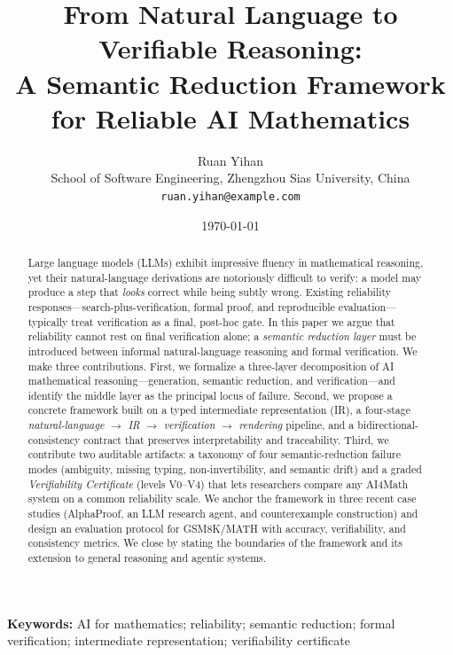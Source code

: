 \documentclass[11pt,a4paper]{article}
\title{\bfseries From Natural Language to Verifiable Reasoning:\\
A Semantic Reduction Framework for Reliable AI Mathematics}
\author{
  Ruan Yihan\\
  \small School of Software Engineering, Zhengzhou Sias University, China\\
  \small \texttt{ruan.yihan@example.com}
}
\date{\today}
\theoremstyle{definition}
\theoremstyle{plain}
\begin{document}
\maketitle

\begin{abstract}
\noindent
Large language models (LLMs) exhibit impressive fluency in mathematical reasoning, yet their
natural-language derivations are notoriously difficult to verify: a model may produce a step that
\emph{looks} correct while being subtly wrong. Existing reliability responses---search-plus-verification,
formal proof, and reproducible evaluation---typically treat verification as a final, post-hoc gate.
In this paper we argue that reliability cannot rest on final verification alone; a \emph{semantic
reduction layer} must be introduced between informal natural-language reasoning and formal verification.
We make three contributions. First, we formalize a three-layer decomposition of AI mathematical
reasoning---generation, semantic reduction, and verification---and identify the middle layer as the
principal locus of failure. Second, we propose a concrete framework built on a typed intermediate
representation (IR), a four-stage \emph{natural-language $\rightarrow$ IR $\rightarrow$ verification
$\rightarrow$ rendering} pipeline, and a bidirectional-consistency contract that preserves
interpretability and traceability. Third, we contribute two auditable artifacts: a taxonomy of four
semantic-reduction failure modes (ambiguity, missing typing, non-invertibility, and semantic drift) and
a graded \emph{Verifiability Certificate} (levels V0--V4) that lets researchers compare any AI4Math
system on a common reliability scale. We anchor the framework in three recent case studies
(AlphaProof, an LLM research agent, and counterexample construction) and design an evaluation protocol
for GSM8K/MATH with accuracy, verifiability, and consistency metrics. We close by stating the
boundaries of the framework and its extension to general reasoning and agentic systems.
\end{abstract}

\noindent\textbf{Keywords:} AI for mathematics; reliability; semantic reduction; formal verification;
intermediate representation; verifiability certificate

\end{document}
